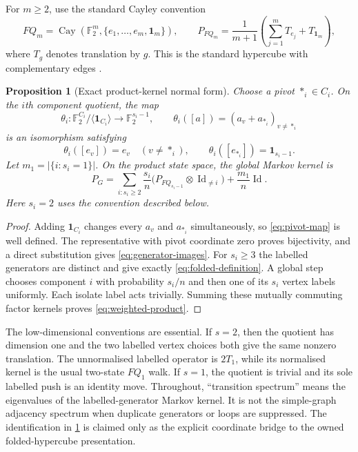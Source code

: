 \documentclass[10pt,a4paper]{amsart}
\newtheorem{proposition}[theorem]{Proposition}
\theoremstyle{remark}
\newcommand{\F}{\mathbb F}
\newcommand{\one}{\mathbf 1}
\newcommand{\Id}{\operatorname{Id}}
\begin{document}
For $m\geq2$, use the standard Cayley convention
\begin{equation}\label{eq:folded-definition}
 FQ_m=\operatorname{Cay}
 \left(\F_2^m,\{e_1,\ldots,e_m,\one_m\}\right),
 \qquad
 P_{FQ_m}=\frac1{m+1}
 \left(\sum_{j=1}^m T_{e_j}+T_{\one_m}\right),
\end{equation}
where $T_g$ denotes translation by $g$.  This is the standard hypercube with
complementary edges \citep{XuMeng2009Folded}.

\begin{proposition}[Exact product-kernel normal form]\label{prop:product}
Choose a pivot $*_i\in C_i$.  On the $i$th component quotient, the map
\begin{equation}\label{eq:pivot-map}
 \theta_i:\F_2^{C_i}/\langle\one_{C_i}\rangle
       \longrightarrow\F_2^{s_i-1},
 \qquad
 \theta_i([a])=(a_v+a_{*_i})_{v\ne *_i}
\end{equation}
is an isomorphism satisfying
\begin{equation}\label{eq:generator-images}
 \theta_i([e_v])=e_v\quad(v\ne *_i),
 \qquad
 \theta_i([e_{*_i}])=\one_{s_i-1}.
\end{equation}
Let $m_1=|\{i:s_i=1\}|$.  On the product state space, the global Markov
kernel is
\begin{equation}\label{eq:weighted-product}
 P_G=\sum_{i:s_i\geq2}\frac{s_i}{n}
       \bigl(P_{FQ_{s_i-1}}\otimes\Id_{\ne i}\bigr)
       +\frac{m_1}{n}\Id.
\end{equation}
Here $s_i=2$ uses the convention described below.
\end{proposition}

\begin{proof}
Adding $\one_{C_i}$ changes every $a_v$ and $a_{*_i}$ simultaneously, so
\eqref{eq:pivot-map} is well defined.  The representative with pivot
coordinate zero proves bijectivity, and a direct substitution gives
\eqref{eq:generator-images}.  For $s_i\geq3$ the labelled generators are
distinct and give exactly \eqref{eq:folded-definition}.  A global step chooses
component $i$ with probability $s_i/n$ and then one of its $s_i$ vertex labels
uniformly.  Each isolate label acts trivially.  Summing these mutually
commuting factor kernels proves \eqref{eq:weighted-product}.
\end{proof}

The low-dimensional conventions are essential.  If $s=2$, then the quotient
has dimension one and the two labelled vertex choices both give the same
nonzero translation.  The unnormalised labelled operator is $2T_1$, while its
normalised kernel is the usual two-state $FQ_1$ walk.  If $s=1$, the quotient
is trivial and its sole labelled push is an identity move.  Throughout,
``transition spectrum'' means the eigenvalues of the labelled-generator
Markov kernel.  It is not the simple-graph adjacency spectrum when duplicate
generators or loops are suppressed.  The identification in
\cref{prop:product} is claimed only as the explicit coordinate bridge to the
owned folded-hypercube presentation.
\end{document}

